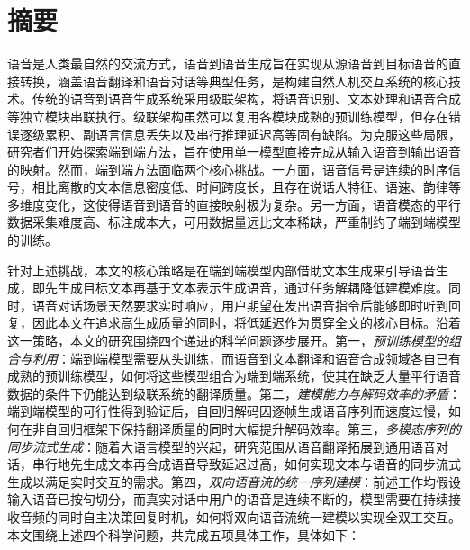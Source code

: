 
\maketitle%
\MAKETITLE%
\intobmk\chapter*{摘\quad 要}%
\setcounter{page}{1}%

语音是人类最自然的交流方式，语音到语音生成旨在实现从源语音到目标语音的直接转换，涵盖语音翻译和语音对话等典型任务，是构建自然人机交互系统的核心技术。传统的语音到语音生成系统采用级联架构，将语音识别、文本处理和语音合成等独立模块串联执行。级联架构虽然可以复用各模块成熟的预训练模型，但存在错误逐级累积、副语言信息丢失以及串行推理延迟高等固有缺陷。为克服这些局限，研究者们开始探索端到端方法，旨在使用单一模型直接完成从输入语音到输出语音的映射。然而，端到端方法面临两个核心挑战。一方面，语音信号是连续的时序信号，相比离散的文本信息密度低、时间跨度长，且存在说话人特征、语速、韵律等多维度变化，这使得语音到语音的直接映射极为复杂。另一方面，语音模态的平行数据采集难度高、标注成本大，可用数据量远比文本稀缺，严重制约了端到端模型的训练。

针对上述挑战，本文的核心策略是在端到端模型内部借助文本生成来引导语音生成，即先生成目标文本再基于文本表示生成语音，通过任务解耦降低建模难度。同时，语音对话场景天然要求实时响应，用户期望在发出语音指令后能够即时听到回复，因此本文在追求高生成质量的同时，将低延迟作为贯穿全文的核心目标。沿着这一策略，本文的研究围绕四个递进的科学问题逐步展开。第一，\textit{预训练模型的组合与利用}：端到端模型需要从头训练，而语音到文本翻译和语音合成领域各自已有成熟的预训练模型，如何将这些模型组合为端到端系统，使其在缺乏大量平行语音数据的条件下仍能达到级联系统的翻译质量。第二，\textit{建模能力与解码效率的矛盾}：端到端模型的可行性得到验证后，自回归解码因逐帧生成语音序列而速度过慢，如何在非自回归框架下保持翻译质量的同时大幅提升解码效率。第三，\textit{多模态序列的同步流式生成}：随着大语言模型的兴起，研究范围从语音翻译拓展到通用语音对话，串行地先生成文本再合成语音导致延迟过高，如何实现文本与语音的同步流式生成以满足实时交互的需求。第四，\textit{双向语音流的统一序列建模}：前述工作均假设输入语音已按句切分，而真实对话中用户的语音是连续不断的，模型需要在持续接收音频的同时自主决策回复时机，如何将双向语音流统一建模以实现全双工交互。本文围绕上述四个科学问题，共完成五项具体工作，具体如下：

